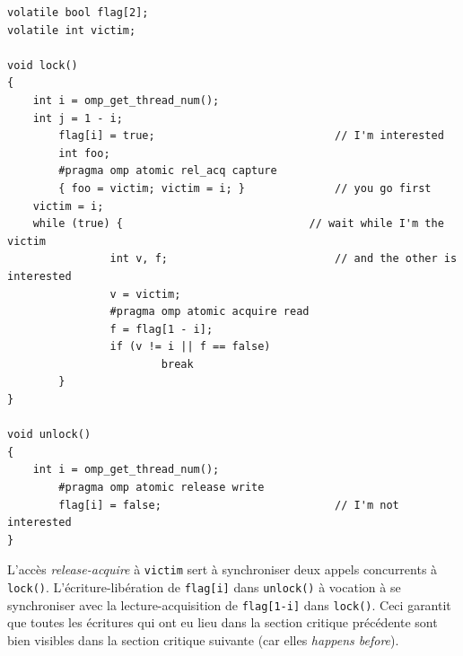 \begin{myfilet}
\begin{verbatim}
volatile bool flag[2];
volatile int victim;

void lock() 
{
	int i = omp_get_thread_num();
	int j = 1 - i;
        flag[i] = true;                            // I'm interested
        int foo;
        #pragma omp atomic rel_acq capture
        { foo = victim; victim = i; }              // you go first
	victim = i;                                
	while (true) {                             // wait while I'm the victim 
                int v, f;                          // and the other is interested
                v = victim;
                #pragma omp atomic acquire read
                f = flag[1 - i];
                if (v != i || f == false)
                        break
        }
}

void unlock() 
{
	int i = omp_get_thread_num();
        #pragma omp atomic release write
        flag[i] = false;                           // I'm not interested
}
\end{verbatim}
\end{myfilet}

L'accès \emph{release-acquire} à \texttt{victim} sert à synchroniser deux appels
concurrents à \texttt{lock()}. L'écriture-libération de \texttt{flag[i]} dans
\texttt{unlock()} à vocation à se synchroniser avec la lecture-acquisition de
\texttt{flag[1-i]} dans \texttt{lock()}. Ceci garantit que toutes les écritures
qui ont eu lieu dans la section critique précédente sont bien \og visibles\fg{}
dans la section critique suivante (car elles \emph{happens before}).
\begin{center}
\end{center}

